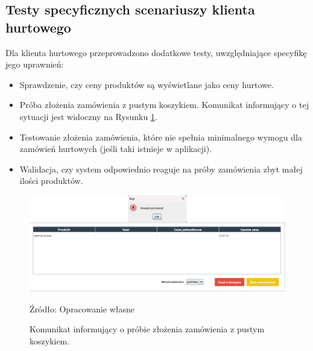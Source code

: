 \begin{minipage}{\linewidth}
\subsection{Testy specyficznych scenariuszy klienta hurtowego}
Dla klienta hurtowego przeprowadzono dodatkowe testy, uwzględniające specyfikę jego uprawnień:
\begin{itemize}
    \item Sprawdzenie, czy ceny produktów są wyświetlane jako ceny hurtowe.
    \item Próba złożenia zamówienia z pustym koszykiem. Komunikat informujący o tej sytuacji jest widoczny na Rysunku \ref{fig:pusty_koszyk}.
    \item Testowanie złożenia zamówienia, które nie spełnia minimalnego wymogu dla zamówień hurtowych (jeśli taki istnieje w aplikacji).
    \item Walidacja, czy system odpowiednio reaguje na próby zamówienia zbyt małej ilości produktów.
\end{itemize}

\begin{figure}[H]
    \centering
    \includegraphics[width=\linewidth]{figures/fig_0006.eps}
    \caption{Komunikat informujący o próbie złożenia zamówienia z pustym koszykiem. }
    \label{fig:pusty_koszyk}
    \small{Źródło: Opracowanie własne}
\end{figure}
\end{minipage}

